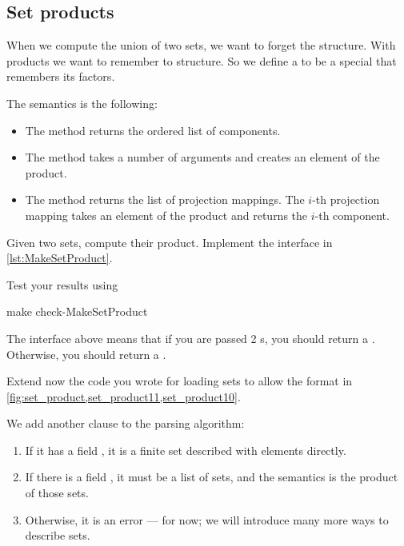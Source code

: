 \subsection{Set products}

When we compute the union of two sets, we want to forget the structure. With products we want to remember to structure.
So we define a  to be a special \Setoid that remembers its factors.



The semantics is the following:
\begin{itemize}
  \item The method  returns the ordered list of components.
  \item The method  takes a number of arguments and creates an element of the product.
  \item The method  returns the list of projection mappings.
  The $i$-th projection mapping takes an element of the product and returns the $i$-th component.

\end{itemize}


\begin{codeexercise}
  Given two sets, compute their product. Implement the interface in \cref{lst:MakeSetProduct}.

  Test your results using

  \begin{console}
    make check-MakeSetProduct
  \end{console}

\end{codeexercise}



The interface above means that if you are passed 2 \FiniteSet{}s, you should return a \FiniteSet.
Otherwise, you should return a \Setoid.



%

%

Extend now the code you wrote for loading sets to allow the format in \cref{fig:set_product,set_product11,set_product10}.

We add another clause to the parsing algorithm:
\begin{enumerate}
  \item If it has a field , it is a finite set described with elements directly.
  \item If there is a field , it must be a list of sets, and the semantics is the product of those sets.
  \item Otherwise, it is an error --- for now; we will introduce many more ways to describe sets.
\end{enumerate}


